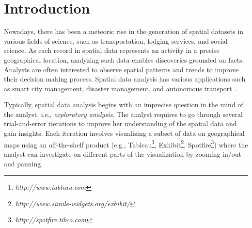 \documentclass[sigconf,edbt]{acmart-edbt2019}
\begin{document}
%
% 




\maketitle

\section{Introduction}
Nowadays, there has been a meteoric rise in the generation of spatial datasets in various fields of science, such as transportation, lodging services, and social science. As each record in spatial data represents an activity in a precise geographical location, analyzing such data enables discoveries grounded on facts. Analysts are often interested to observe spatial patterns and trends to improve their decision making process. Spatial data analysis has various applications such as smart city management, disaster management, and autonomous transport \cite{RoddickEHPS04,Telang:2012}.

\vspace{2pt}
Typically, spatial data analysis begins with an imprecise question in the mind of the analyst, i.e., {\em exploratory analysis}. The analyst requires to go through several trial-and-error iterations to improve her understanding of the spatial data and gain insights. Each iteration involves visualizing a subset of data on geographical maps using an  off-the-shelf product (e.g., Tableau\footnote{\it http://www.tableau.com}, Exhibit\footnote{\it http://www.simile-widgets.org/exhibit/}, Spotfire\footnote{\it http://spotfire.tibco.com}) where the analyst can investigate on different parts of the visualization by zooming in/out and panning.
\end{document}
